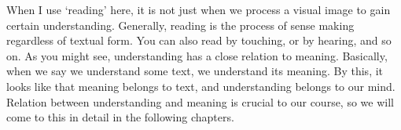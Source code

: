 When I use `reading' here, it is not just when we process a visual image to gain certain understanding. Generally, reading is the process of sense making regardless of textual form. You can also read by touching, or by hearing, and so on. As you might see, understanding has a close relation to meaning. Basically, when we say we understand some text, we understand its meaning. By this, it looks like that meaning belongs to text, and understanding belongs to our mind. Relation between understanding and meaning is crucial to our course, so we will come to this in detail in the following chapters.
